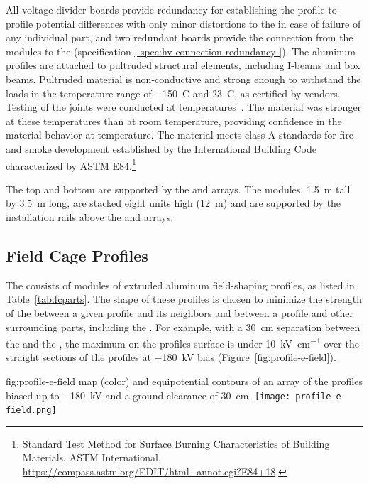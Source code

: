 All voltage divider boards provide redundancy for establishing the profile-to-profile potential differences with only minor distortions to the \efield in case of failure of any individual part, and two redundant boards provide the connection from the  modules to the  
(specification \ref{ spec:hv-connection-redundancy }).  
The aluminum profiles are attached to  pultruded structural elements, including I-beams and box beams.  
Pultruded  material is non-conductive and strong enough to withstand the  loads  in the temperature range of \SI{-150}{C} and \SI{23}{C}, as certified by vendors. Testing of the  joints were conducted at  temperatures~\cite{bib:docdb1504}. 
The material was stronger at these temperatures than at room temperature, 
providing confidence in the material behavior at   temperature. The  material meets class A standards for fire and smoke development established by the International Building Code characterized by ASTM E84.\footnote{Standard Test Method for Surface Burning Characteristics of Building Materials, ASTM International, \url{https://compass.astm.org/EDIT/html_annot.cgi?E84+18}.}

The top and bottom  %
are supported by the  and  arrays. The  modules, 
\SI{1.5}{\m} tall by \SI{3.5}{\m} long, are stacked eight units high (\SI{12}{\m}) and are supported by the installation rails above the  and  arrays.



\subsection{Field Cage Profiles}
\label{sec:fdsp-hv-des-fc-profiles}

The  consists of modules of extruded aluminum  field-shaping  %
profiles, as listed in Table~\ref{tab:fcparts}. The shape of these %
profiles is chosen to minimize the strength of the \efield{} between a given profile and its neighbors and between a profile and
other surrounding parts, including the . For example, with a \SI{30}{\cm} separation between the  and the , the maximum \efield{} on the profiles surface is under \SI{10}{\kilo\volt\per\centi\meter} over the straight sections of the profiles at \SI{-180}{\kV} bias (Figure~\ref{fig:profile-e-field}).  


\begin{dunefigure}
{fig:profile-e-field}
{\efield{} map (color) and equipotential contours of an array of the  profiles biased up to \SI{-180}{\kV} and a ground clearance of \SI{30}{\cm}.} %
\texttt{[image: profile-e-field.png]}
\end{dunefigure}

